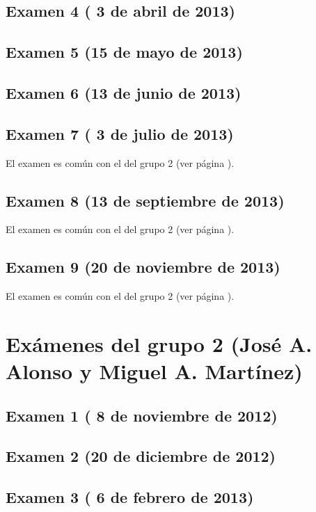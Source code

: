 \documentclass[a4paper,12pt,twoside]{book}
\begin{document}
\subsection{Examen 4 ( 3 de abril de 2013)}
\subsection{Examen 5 (15 de mayo de 2013)}
\subsection{Examen 6 (13 de junio de 2013)} 
\label{examen_12_13_1_6}
\subsection{Examen 7 ( 3 de julio de 2013)} 
El examen es común con el del grupo 2 (ver página \pageref{examen_12_13_2_7}).
\subsection{Examen 8 (13 de septiembre de 2013)} 
El examen es común con el del grupo 2 (ver página \pageref{examen_12_13_2_8}).
\subsection{Examen 9 (20 de noviembre de 2013)} 
El examen es común con el del grupo 2 (ver página \pageref{examen_12_13_2_9}).

\section{Exámenes del grupo 2 (José A. Alonso y Miguel A. Martínez)}
\subsection{Examen 1 ( 8 de noviembre de 2012)}
\subsection{Examen 2 (20 de diciembre de 2012)}
\subsection{Examen 3 ( 6 de febrero de 2013)}
\label{examen_12_13_2_3}
\end{document}
